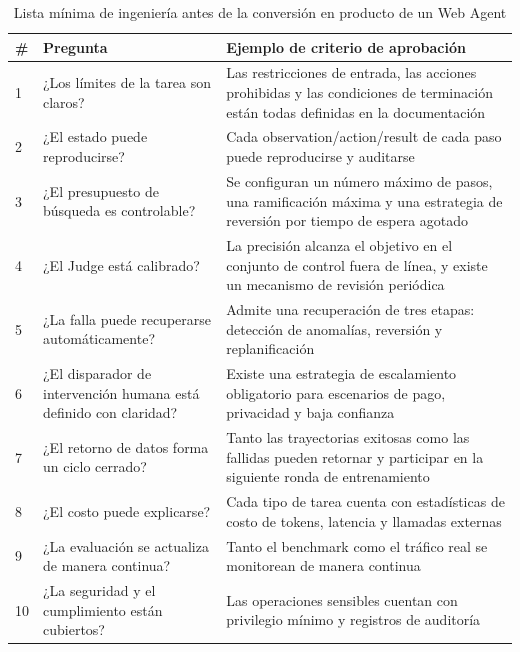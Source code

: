 \documentclass[a4paper]{article}
\begin{document}
\begin{table}[H]
\centering
\small
\begin{tabular}{p{0.8cm}p{3.9cm}p{5.8cm}}
\toprule
\textbf{\#} & \textbf{Pregunta} & \textbf{Ejemplo de criterio de aprobación} \\
\midrule
1 & ¿Los límites de la tarea son claros? & Las restricciones de entrada, las acciones prohibidas y las condiciones de terminación están todas definidas en la documentación \\
2 & ¿El estado puede reproducirse? & Cada observation/action/result de cada paso puede reproducirse y auditarse \\
3 & ¿El presupuesto de búsqueda es controlable? & Se configuran un número máximo de pasos, una ramificación máxima y una estrategia de reversión por tiempo de espera agotado \\
4 & ¿El Judge está calibrado? & La precisión alcanza el objetivo en el conjunto de control fuera de línea, y existe un mecanismo de revisión periódica \\
5 & ¿La falla puede recuperarse automáticamente? & Admite una recuperación de tres etapas: detección de anomalías, reversión y replanificación \\
6 & ¿El disparador de intervención humana está definido con claridad? & Existe una estrategia de escalamiento obligatorio para escenarios de pago, privacidad y baja confianza \\
7 & ¿El retorno de datos forma un ciclo cerrado? & Tanto las trayectorias exitosas como las fallidas pueden retornar y participar en la siguiente ronda de entrenamiento \\
8 & ¿El costo puede explicarse? & Cada tipo de tarea cuenta con estadísticas de costo de tokens, latencia y llamadas externas \\
9 & ¿La evaluación se actualiza de manera continua? & Tanto el benchmark como el tráfico real se monitorean de manera continua \\
10 & ¿La seguridad y el cumplimiento están cubiertos? & Las operaciones sensibles cuentan con privilegio mínimo y registros de auditoría \\
\bottomrule
\end{tabular}
\caption{Lista mínima de ingeniería antes de la conversión en producto de un Web Agent}
\end{table}
\end{document}
